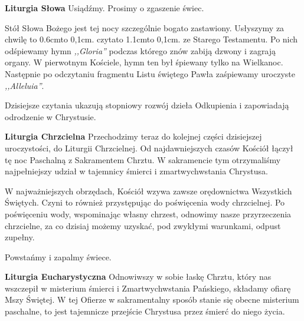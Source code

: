 \documentclass[10pt,oneside,final,notitlepage,a4paper,wide]{mwart}
\def\dotfill#1{\cleaders\hbox to #1{.}\hfill}
\newcommand\dotline[2][0,1cm]{\leavevmode\hbox to #2{\dotfill{#1}\hfil}}
\begin{document}
	\textbf{Liturgia Słowa} Usiądźmy. Prosimy o zgaszenie świec.
\par Stół Słowa Bożego jest tej nocy szczególnie bogato zastawiony. Usłyszymy za chwilę \dotline{0.6cm} czyta\dotline{1.1cm} ze Starego Testamentu. Po nich odśpiewamy hymn \emph{,,Gloria''} podczas którego znów zabiją dzwony i zagrają organy. W pierwotnym Kościele, hymn ten był śpiewany tylko na Wielkanoc. Następnie po odczytaniu fragmentu Listu świętego Pawła zaśpiewamy uroczyste \emph{,,Alleluia''}.
\par Dzisiejsze czytania ukazują stopniowy rozwój dzieła Odkupienia i zapowiadają odrodzenie w Chrystusie. \newpage %

	\textbf{Liturgia Chrzcielna} Przechodzimy teraz do kolejnej części dzisiejszej uroczystości, do Liturgii Chrzcielnej. Od najdawniejszych czasów Kościół łączył tę noc Paschalną z Sakramentem Chrztu. W sakramencie tym otrzymaliśmy najpełniejszy udział w tajemnicy śmierci i zmartwychwstania Chrystusa.
\par W najważniejszych obrzędach, Kościół wzywa zawsze orędownictwa Wszystkich Świętych. Czyni to również przystępując do poświęcenia wody chrzcielnej. Po poświęceniu wody, wspominając własny chrzest, odnowimy nasze przyrzeczenia chrzcielne, za co dzisiaj możemy uzyskać, pod zwykłymi warunkami, odpust zupełny.
\par Powstańmy i zapalmy świece. \bigskip

	\textbf{Liturgia Eucharystyczna} Odnowiwszy w sobie łaskę Chrztu, który nas wszczepił w misterium śmierci i Zmartwychwstania Pańskiego, składamy ofiarę Mszy Świętej. W tej Ofierze w sakramentalny sposób stanie się obecne misterium paschalne, to jest tajemnicze przejście Chrystusa przez śmierć do niego życia.
\end{document}
